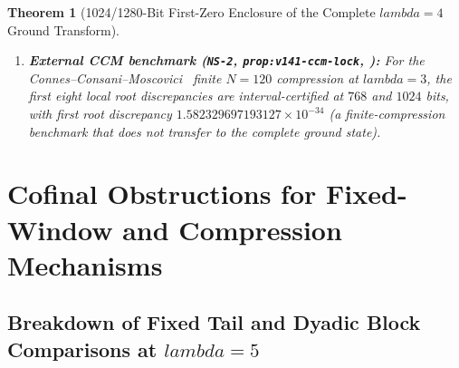 \documentclass[11pt]{article}
\def\lambda{lambda}%
\def\norm#1{||#1||}%
\newtheorem{theorem}{Theorem}[section]
\theoremstyle{remark}
\newcommand{\norm}[1]{\left\lVert #1\right\rVert}
\newcommand{\dd}{\mathrm d}
\begin{document}
\begin{theorem}[1024/1280-Bit First-Zero Enclosure of the Complete $\lambda = 4$ Ground Transform]
\begin{enumerate}[label=(\alph*)]
\begin{equation}
    |\ell(v)|^2 \le C_\ell\, q_{\log 4}[v], \qquad C_\ell = \frac{A^2 + B^2 + 2\sqrt{1 - \kappa_{\mathrm{ev}}}\,AB}{\kappa_{\mathrm{ev}}}.
  \end{equation}
  Taking $\ell(v) = \int_{-\log 4}^{\log 4} v(x)\cos(\gamma_1 x)\,\dd x$ (with exact Parseval tail $\norm{\ell_t}_2^2 = \frac{L}{2} + \frac{\sin(\gamma_1 L)}{2\gamma_1} - \sum_{n=0}^{16} c_n^2$, $C_\ell < 79921$) and excluding earlier positive zeros on $(0, \gamma_1 - \tfrac{1}{10}]$ at $1024$ and $1280$ bits (inheriting the $320$-bit tail floor $\delta$ and $768/896$-bit Schur ingredients $K_{\mathrm{ev}}, \kappa_{\mathrm{ev}}$), the first positive zero $z_1(4)$ of $\widehat{\xi}_4$ satisfies
  \begin{equation}\label{eq:v143-first-zero-absolute}
    -8.752082 \times 10^{-33} < z_1(4) - \gamma_1 < 8.752082 \times 10^{-33}.
  \end{equation}
  The interval includes zero; neither the sign of $z_1(4) - \gamma_1$ nor a nonzero lower bound on $|z_1(4) - \gamma_1|$ is certified.
  \item \textbf{External CCM benchmark (\texttt{NS-2}, \texttt{prop:v141-ccm-lock}, ):} For the Connes--Consani--Moscovici~\cite{ConnesConsaniMoscovici2025} finite $N = 120$ compression at $\lambda = 3$, the first eight local root discrepancies are interval-certified at $768$ and $1024$ bits, with first root discrepancy $1.582329697193127 \times 10^{-34}$ (a finite-compression benchmark that does not transfer to the complete ground state).
\end{enumerate}
\end{theorem}

\section{Cofinal Obstructions for Fixed-Window and Compression Mechanisms}
\label{sec:obstructions}

\subsection{Breakdown of Fixed Tail and Dyadic Block Comparisons at \texorpdfstring{$\lambda = 5$}{lambda = 5}}
\end{document}

